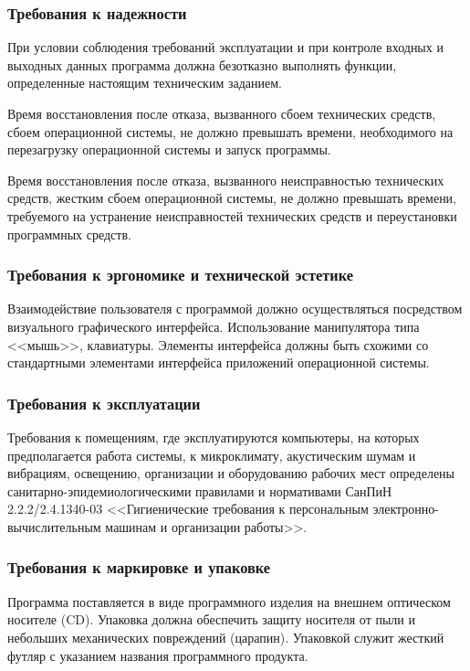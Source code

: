 \subsubsection{Требования к надежности}

При условии соблюдения требований эксплуатации и при контроле входных и выходных данных программа должна безотказно выполнять функции, определенные настоящим техническим заданием.

Время восстановления после отказа, вызванного сбоем технических средств, сбоем операционной системы, не должно превышать времени, необходимого на перезагрузку операционной системы и запуск программы.

Время восстановления после отказа, вызванного неисправностью технических средств, жестким сбоем операционной системы, не должно превышать времени, требуемого на устранение неисправностей технических средств и переустановки программных средств.

\subsubsection{Требования к эргономике и технической эстетике}

Взаимодействие пользователя с программой должно осуществляться посредством визуального графического интерфейса. Использование манипулятора типа <<мышь>>, клавиатуры. Элементы интерфейса должны быть схожими со стандартными элементами интерфейса приложений операционной системы. 

\subsubsection{Требования к эксплуатации}

Требования к помещениям, где эксплуатируются компьютеры, на которых предполагается работа системы, к микроклимату, акустическим шумам и вибрациям, освещению, организации и оборудованию рабочих мест определены санитарно-эпидемиологическими правилами и нормативами СанПиН 2.2.2/2.4.1340-03 <<Гигиенические требования к персональным электронно-вычислительным машинам и организации работы>>.

\subsubsection{Требования к маркировке и упаковке}

Программа поставляется в виде программного изделия на внешнем оптическом носителе (CD). 
Упаковка должна обеспечить защиту носителя от пыли и небольших механических повреждений (царапин). Упаковкой служит жесткий футляр с указанием названия программного продукта.

